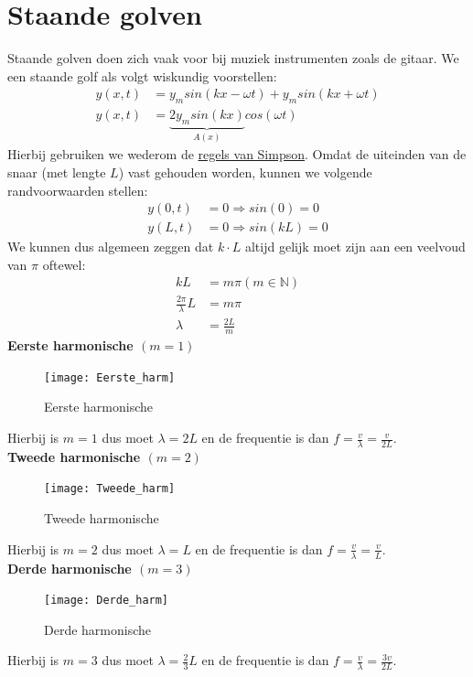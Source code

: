 \documentclass[a4paper,kul]{kulakarticle} %
\begin{document}
\section{Staande golven}
Staande golven doen zich vaak voor bij muziek instrumenten zoals de gitaar. We een staande golf als volgt wiskundig voorstellen:
\begin{align*}
	y(x,t) &=y_msin(kx-\omega t)+y_msin(kx+\omega t)\\
	y(x,t) &=\underbrace{2y_msin(kx)}_{A(x)}cos(\omega t)
\end{align*}
Hierbij gebruiken we wederom de \href{https://nl.wikipedia.org/wiki/Lijst_van_goniometrische_gelijkheden#Som-naar-product-identiteiten_(regels_van_Simpson)}{regels van Simpson}. Omdat de uiteinden van de snaar (met lengte $L$) vast gehouden worden, kunnen we volgende randvoorwaarden stellen:
\begin{align*}
	y(0,t)  &= 0 \Rightarrow sin(0)=0\\
	y(L,t) &= 0 \Rightarrow sin(kL)=0
\end{align*}
We kunnen dus algemeen zeggen dat $k\cdot L$ altijd gelijk moet zijn aan een veelvoud van $\pi$ oftewel:
\begin{align*}
	kL & = m\pi (m\in\mathbb{N})\\
	\frac{2\pi}{\lambda}L &=m\pi\\
	\lambda & = \frac{2L}{m}
\end{align*}
\textbf{Eerste harmonische $(m = 1)$}\\
\begin{figure}[h]
	\centering
	\texttt{[image: Eerste\_harm]}
	\caption[Eerste harmonische]{Eerste harmonische}
	\label{fig:eersteharm}
\end{figure}
Hierbij is $m = 1$ dus moet $\lambda = 2L$ en de frequentie is dan $f = \frac{v}{\lambda} = \frac{v}{2L}$.\\
\newpage
\textbf{Tweede harmonische $(m = 2)$}\\
\begin{figure}[h]
	\centering
	\texttt{[image: Tweede\_harm]}
	\caption[Tweede harmonische]{Tweede harmonische}
	\label{fig:tweedeharm}
\end{figure}
Hierbij is $m = 2$ dus moet $\lambda = L$ en de frequentie is dan $f = \frac{v}{\lambda} = \frac{v}{L}$.\\
\textbf{Derde harmonische $(m = 3)$}\\
\begin{figure}[h]
	\centering
	\texttt{[image: Derde\_harm]}
	\caption[Derde harmonische]{Derde harmonische}
	\label{fig:Derdeharm}
\end{figure}
Hierbij is $m = 3$ dus moet $\lambda = \frac{2}{3}L$ en de frequentie is dan $f = \frac{v}{\lambda} = \frac{3v}{2L}$.\\
\newpage
\end{document}

